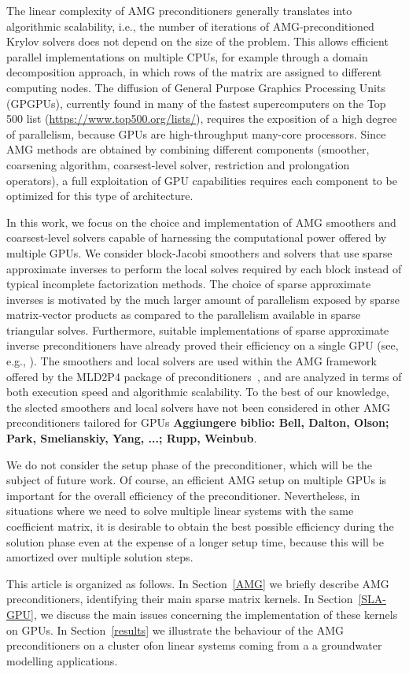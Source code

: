 The linear complexity of AMG preconditioners generally
translates into algorithmic scalability, i.e., the number of iterations
of AMG-preconditioned Krylov solvers does not depend on the size of the
problem. This allows efficient parallel implementations on multiple CPUs,
for example through a domain decomposition approach, in which rows of
the matrix are assigned to different computing nodes.
The diffusion of General Purpose Graphics Processing Units (GPGPUs),
currently found in many of the fastest supercomputers on the Top 500 list
(\url{https://www.top500.org/lists/}), requires the exposition of a high
degree of parallelism, because GPUs are high-throughput many-core processors.
Since AMG methods are obtained by combining different components (smoother,
coarsening algorithm, coarsest-level solver, restriction and prolongation operators),
a full exploitation of GPU capabilities requires each component to be optimized
for this type of architecture.

In this work, we focus on the choice and implementation of AMG smoothers
and coarsest-level solvers capable of harnessing the computational power offered by
multiple GPUs. We consider block-Jacobi smoothers and solvers that use sparse
approximate inverses to perform the local solves required by each block instead of typical
incomplete factorization methods. The choice of sparse approximate inverses
is motivated by the much larger amount of parallelism exposed by
sparse matrix-vector products as compared to the parallelism available
in sparse triangular solves. Furthermore, suitable implementations of sparse approximate
inverse preconditioners have already proved their efficiency on a single GPU (see, e.g.,
\cite{BERTACCINI2016693}). The smoothers and local solvers are used within
the AMG framework offered by the MLD2P4 package of preconditioners~\cite{mld-toms},
and are analyzed in terms of both execution speed and algorithmic scalability.
To the best of our knowledge, the slected smoothers and local solvers have not been
considered in other AMG preconditioners tailored for GPUs \cite{} \textbf{Aggiungere biblio:
Bell, Dalton, Olson; Park, Smelianskiy, Yang, ...; Rupp, Weinbub}.

We do not consider the setup phase of the preconditioner,
which will be the subject of future work. Of course, an efficient
AMG setup on multiple GPUs is important for the overall efficiency of the
preconditioner. Nevertheless, in situations where we need to solve multiple
linear systems with the same coefficient matrix, it is desirable to obtain
the best possible efficiency during the solution phase even at the expense of a
longer setup time, because this will be amortized over multiple
solution steps.

This article is organized as follows. In Section~\ref{AMG} we briefly describe AMG preconditioners,
identifying their main sparse matrix kernels. In Section~\ref{SLA-GPU}, we discuss the main issues
concerning the implementation of these kernels on GPUs. In Section~\ref{results} we illustrate the
behaviour of the AMG preconditioners on a cluster ofon linear systems coming from a
a groundwater modelling applications.





